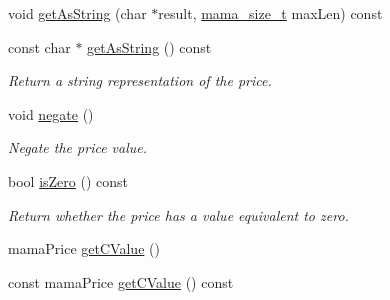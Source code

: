 \begin{DoxyCompactItemize}
void \hyperlink{classWombat_1_1MamaPrice_ae735ce0fedcead944050df2460ef33a0}{getAsString} (char $\ast$result, \hyperlink{classmama__size__t}{mama\_\-size\_\-t} maxLen) const 
\item 
const char $\ast$ \hyperlink{classWombat_1_1MamaPrice_afc70ff08184de27cac8f656d6878f702}{getAsString} () const 
\begin{DoxyCompactList}\small\item\em Return a string representation of the price. \item\end{DoxyCompactList}\item 
void \hyperlink{classWombat_1_1MamaPrice_a8352d77ec2751d6002395c5c3a153323}{negate} ()
\begin{DoxyCompactList}\small\item\em Negate the price value. \item\end{DoxyCompactList}\item 
bool \hyperlink{classWombat_1_1MamaPrice_ae691b4520967f5112c561684cefdc58a}{isZero} () const 
\begin{DoxyCompactList}\small\item\em Return whether the price has a value equivalent to zero. \item\end{DoxyCompactList}\item 
mamaPrice \hyperlink{classWombat_1_1MamaPrice_a21d57c1c44d9495a71bd29e07d3ac9a7}{getCValue} ()
\item 
const mamaPrice \hyperlink{classWombat_1_1MamaPrice_a653f2e58af782ef2b3549332cc804196}{getCValue} () const 
\end{DoxyCompactItemize}
